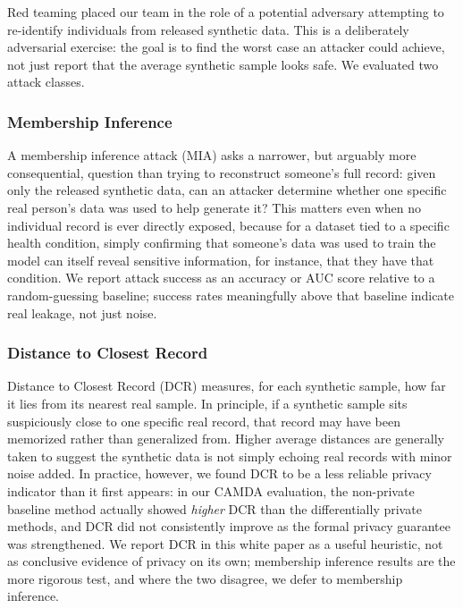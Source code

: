 Red teaming placed our team in the role of a potential adversary attempting to re-identify individuals from released synthetic data. This is a deliberately adversarial exercise: the goal is to find the worst case an attacker could achieve, not just report that the average synthetic sample looks safe. We evaluated two attack classes.

\subsubsection{Membership Inference}

A membership inference attack (MIA) asks a narrower, but arguably more consequential, question than trying to reconstruct someone's full record: given only the released synthetic data, can an attacker determine whether one specific real person's data was used to help generate it? This matters even when no individual record is ever directly exposed, because for a dataset tied to a specific health condition, simply confirming that someone's data was used to train the model can itself reveal sensitive information, for instance, that they have that condition. We report attack success as an accuracy or AUC score relative to a random-guessing baseline; success rates meaningfully above that baseline indicate real leakage, not just noise.

\subsubsection{Distance to Closest Record}

Distance to Closest Record (DCR) measures, for each synthetic sample, how far it lies from its nearest real sample. In principle, if a synthetic sample sits suspiciously close to one specific real record, that record may have been memorized rather than generalized from. Higher average distances are generally taken to suggest the synthetic data is not simply echoing real records with minor noise added. In practice, however, we found DCR to be a less reliable privacy indicator than it first appears: in our CAMDA evaluation, the non-private baseline method actually showed \emph{higher} DCR than the differentially private methods, and DCR did not consistently improve as the formal privacy guarantee was strengthened. We report DCR in this white paper as a useful heuristic, not as conclusive evidence of privacy on its own; membership inference results are the more rigorous test, and where the two disagree, we defer to membership inference.

